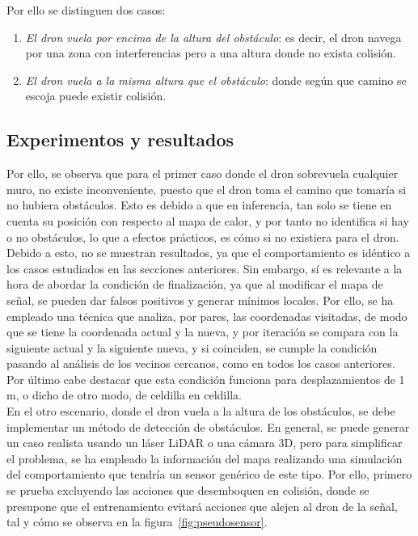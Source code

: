 Por ello se distinguen dos casos:

\begin{enumerate}
    \item \emph{El dron vuela por encima de la altura del obstáculo}: es decir, el dron navega por una zona con interferencias pero a una altura donde no exista colisión.
    \item \emph{El dron vuela a la misma altura que el obstáculo}: donde según que camino se escoja puede existir colisión.
\end{enumerate}

\subsection{Experimentos y resultados}
\label{subsec:experimentos_sfo}

Por ello, se observa que para el primer caso donde el dron sobrevuela cualquier muro, no existe inconveniente, puesto que el dron toma el camino que tomaría si no hubiera obstáculos. Esto es debido a que en inferencia, tan solo se tiene en cuenta su posición con respecto al mapa de calor, y por tanto no identifica si hay o no obstáculos, lo que a efectos prácticos, es cómo si no existiera para el dron. Debido a esto, no se muestran resultados, ya que el comportamiento es idéntico a los casos estudiados en las secciones anteriores. Sin embargo, sí es relevante a la hora de abordar la condición de finalización, ya que al modificar el mapa de señal, se pueden dar falsos positivos y generar mínimos locales. Por ello, se ha empleado una técnica que analiza, por pares, las coordenadas visitadas, de modo que se tiene la coordenada actual y la nueva, y por iteración se compara con la siguiente actual y la siguiente nueva, y si coinciden, se cumple la condición pasando al análisis de los vecinos cercanos, como en todos los casos anteriores. Por último cabe destacar que esta condición funciona para desplazamientos de 1 m, o dicho de otro modo, de celdilla en celdilla.\\

En el otro escenario, donde el dron vuela a la altura de los obstáculos, se debe implementar un método de detección de obstáculos. En general, se puede generar un caso realista usando un láser LiDAR o una cámara 3D, pero para simplificar el problema, se ha empleado la información del mapa realizando una simulación del comportamiento que tendría un sensor genérico de este tipo. Por ello, primero se prueba excluyendo las acciones que desemboquen en colisión, donde se presupone que el entrenamiento evitará acciones que alejen al dron de la señal, tal y cómo se observa en la figura~\ref{fig:pseudosensor}.\\

